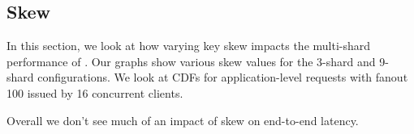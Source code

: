 \subsection{Skew}
In this section, we look at how varying key skew impacts the multi-shard performance of \system.
Our graphs show various skew values for the 3-shard and 9-shard configurations. We look at CDFs for application-level requests with fanout 100 issued by 16 concurrent clients. 

Overall we don't see much of an impact of skew on end-to-end latency.

